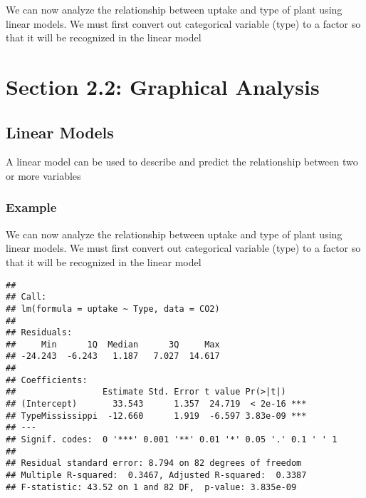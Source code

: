 \documentclass[
]{article}
\newenvironment{Shaded}{\begin{snugshade}}{\end{snugshade}}
\newcommand{\AttributeTok}[1]{\textcolor[rgb]{0.13,0.29,0.53}{#1}}
\newcommand{\FunctionTok}[1]{\textcolor[rgb]{0.13,0.29,0.53}{\textbf{#1}}}
\newcommand{\NormalTok}[1]{#1}
\newcommand{\OtherTok}[1]{\textcolor[rgb]{0.56,0.35,0.01}{#1}}
\newcommand{\SpecialCharTok}[1]{\textcolor[rgb]{0.81,0.36,0.00}{\textbf{#1}}}
\begin{document}
We can now analyze the relationship between uptake and type of plant
using linear models. We must first convert out categorical variable
(type) to a factor so that it will be recognized in the linear model

\section{Section 2.2: Graphical
Analysis}\label{section-2.2-graphical-analysis}

\subsection{Linear Models}\label{linear-models}

A linear model can be used to describe and predict the relationship
between two or more variables

\subsubsection{Example}\label{example-3}

We can now analyze the relationship between uptake and type of plant
using linear models. We must first convert out categorical variable
(type) to a factor so that it will be recognized in the linear model

\begin{Shaded}
\end{Shaded}

\begin{verbatim}
## 
## Call:
## lm(formula = uptake ~ Type, data = CO2)
## 
## Residuals:
##     Min      1Q  Median      3Q     Max 
## -24.243  -6.243   1.187   7.027  14.617 
## 
## Coefficients:
##                 Estimate Std. Error t value Pr(>|t|)    
## (Intercept)       33.543      1.357  24.719  < 2e-16 ***
## TypeMississippi  -12.660      1.919  -6.597 3.83e-09 ***
## ---
## Signif. codes:  0 '***' 0.001 '**' 0.01 '*' 0.05 '.' 0.1 ' ' 1
## 
## Residual standard error: 8.794 on 82 degrees of freedom
## Multiple R-squared:  0.3467, Adjusted R-squared:  0.3387 
## F-statistic: 43.52 on 1 and 82 DF,  p-value: 3.835e-09
\end{verbatim}
\end{document}
